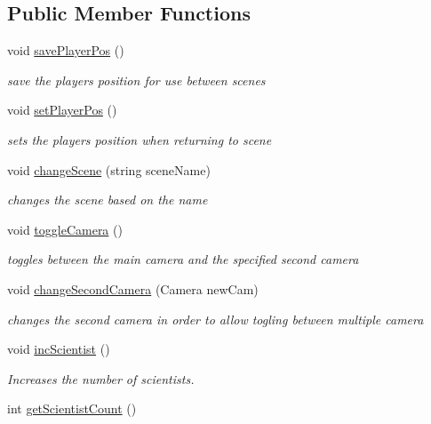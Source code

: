 \subsection*{Public Member Functions}
\begin{DoxyCompactItemize}
\item 
void \hyperlink{class_global_controller_a5a71c2551eef6be2304110c96a31cb55}{save\+Player\+Pos} ()
\begin{DoxyCompactList}\small\item\em save the players position for use between scenes \end{DoxyCompactList}\item 
void \hyperlink{class_global_controller_a3424caeaad35cc27c958d453ac7586fc}{set\+Player\+Pos} ()
\begin{DoxyCompactList}\small\item\em sets the players position when returning to scene \end{DoxyCompactList}\item 
void \hyperlink{class_global_controller_af0ae9de1725a09bce4a16209a5b638ea}{change\+Scene} (string scene\+Name)
\begin{DoxyCompactList}\small\item\em changes the scene based on the name \end{DoxyCompactList}\item 
void \hyperlink{class_global_controller_af4ff92ac33a69fb09fd302cd775b9e96}{toggle\+Camera} ()
\begin{DoxyCompactList}\small\item\em toggles between the main camera and the specified second camera \end{DoxyCompactList}\item 
void \hyperlink{class_global_controller_a58e7beb6be20379f00ed7f63c0a1890a}{change\+Second\+Camera} (Camera new\+Cam)
\begin{DoxyCompactList}\small\item\em changes the second camera in order to allow togling between multiple camera \end{DoxyCompactList}\item 
void \hyperlink{class_global_controller_a84e2d66e0c6c9baa79963554f6f3b2bd}{inc\+Scientist} ()
\begin{DoxyCompactList}\small\item\em Increases the number of scientists. \end{DoxyCompactList}\item 
int \hyperlink{class_global_controller_aa5e702709ea41c25a8a537556671ff47}{get\+Scientist\+Count} ()

\end{DoxyCompactItemize}
